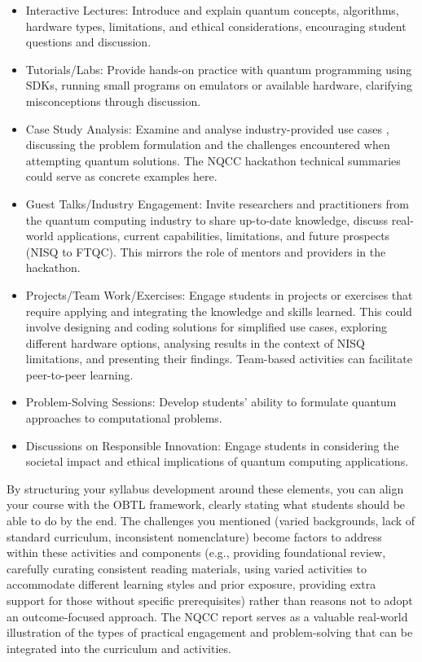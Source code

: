 \documentclass[11pt,a4paper]{article}
\begin{document}
\begin{itemize}	

\item Interactive Lectures: Introduce and explain quantum concepts, algorithms, hardware types, limitations, and ethical considerations, encouraging student questions and discussion.

\item Tutorials/Labs: Provide hands-on practice with quantum programming using SDKs, running small programs on emulators or available hardware, clarifying misconceptions through discussion.

\item Case Study Analysis: Examine and analyse industry-provided use cases
, discussing the problem formulation and the challenges encountered when attempting quantum solutions. The NQCC hackathon technical summaries could serve as concrete examples here.

\item Guest Talks/Industry Engagement: Invite researchers and practitioners from the quantum computing industry to share up-to-date knowledge, discuss real-world applications, current capabilities, limitations, and future prospects (NISQ to FTQC).  This mirrors the role of mentors and providers in the hackathon.

\item Projects/Team Work/Exercises: Engage students in projects or exercises that require applying and integrating the knowledge and skills learned.
 This could involve designing and coding solutions for simplified use cases, exploring different hardware options, analysing results in the context of NISQ limitations, and presenting their findings. Team-based activities can facilitate peer-to-peer learning.

\item Problem-Solving Sessions: Develop students' ability to formulate quantum approaches to computational problems.

\item Discussions on Responsible Innovation: Engage students in considering the societal impact and ethical implications of quantum computing applications.

\end{itemize}	

By structuring your syllabus development around these elements, you can align your course with the OBTL framework, clearly stating what students should be able to do by the end. The challenges you mentioned (varied backgrounds, lack of standard curriculum, inconsistent nomenclature) become factors to address within these activities and components (e.g., providing foundational review, carefully curating consistent reading materials, using varied activities to accommodate different learning styles and prior exposure, providing extra support for those without specific prerequisites) rather than reasons not to adopt an outcome-focused approach. The NQCC report serves as a valuable real-world illustration of the types of practical engagement and problem-solving that can be integrated into the curriculum and activities.
\end{document}
